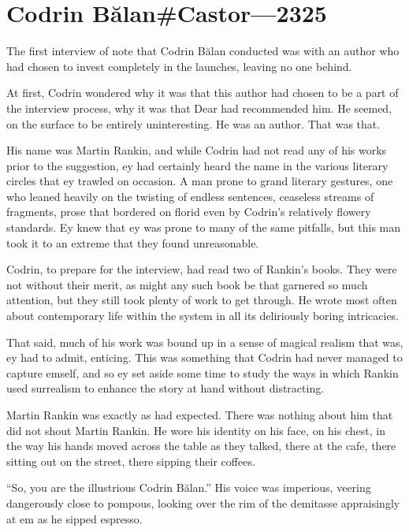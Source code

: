 \hypertarget{codrin-bux103lancastor-2325}{%
\chapter{Codrin Bălan\#Castor---2325}\label{codrin-bux103lancastor-2325}}

The first interview of note that Codrin Bălan conducted was with an author who had chosen to invest completely in the launches, leaving no one behind.

At first, Codrin wondered why it was that this author had chosen to be a part of the interview process, why it was that Dear had recommended him. He seemed, on the surface to be entirely uninteresting. He was an author. That was that.

His name was Martin Rankin, and while Codrin had not read any of his works prior to the suggestion, ey had certainly heard the name in the various literary circles that ey trawled on occasion. A man prone to grand literary gestures, one who leaned heavily on the twisting of endless sentences, ceaseless streams of fragments, prose that bordered on florid even by Codrin's relatively flowery standards. Ey knew that ey was prone to many of the same pitfalls, but this man took it to an extreme that they found unreasonable.

Codrin, to prepare for the interview, had read two of Rankin's books. They were not without their merit, as might any such book be that garnered so much attention, but they still took plenty of work to get through. He wrote most often about contemporary life within the system in all its deliriously boring intricacies.

That said, much of his work was bound up in a sense of magical realism that was, ey had to admit, enticing. This was something that Codrin had never managed to capture emself, and so ey set aside some time to study the ways in which Rankin used surrealism to enhance the story at hand without distracting.

Martin Rankin was exactly as had expected. There was nothing about him that did not shout Martin Rankin. He wore his identity on his face, on his chest, in the way his hands moved across the table as they talked, there at the cafe, there sitting out on the street, there sipping their coffees.

``So, you are the illustrious Codrin Bălan.'' His voice was imperious, veering dangerously close to pompous, looking over the rim of the demitasse appraisingly at em as he sipped espresso.

